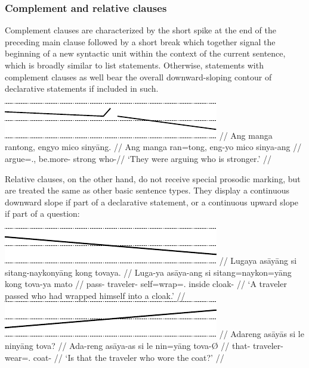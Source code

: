 \subsubsection{Complement and relative clauses}

Complement clauses are characterized by the short 
spike at the end of the preceding main clause followed by a short break which 
together signal the beginning of a new syntactic unit within the context of 
the current sentence, which is broadly similar to list statements. Otherwise, 
statements with complement clauses as well bear the overall downward-sloping 
contour of declarative statements if included in such.

\ex\begingl
	\glpreamble \raisebox{-1.5em}
		{\includegraphics{images/contours-complement.pdf}} //
	\gla Ang manga rantong, engyo mico sinyāng. //
	\glb Ang manga ran=tong, eng-yo mico sinya-ang //
	\glc \AgtT{} \Prog{} argue=\TplN{}.\Aarg{}, be.more-\TsgN{} strong
		who-\Aarg{}//
	\glft `They were arguing who is stronger.' //
\endgl\xe

Relative clauses, on the other hand, do not receive 
special prosodic marking, but are treated the same as other basic sentence 
types. They display a continuous downward slope if part of a 
declarative statement, or a continuous upward slope if part of a question:

\pex[belowexskip=0em]
\a\begingl
	\glpreamble \raisebox{-1.5em}
		{\includegraphics{images/contours-statement.pdf}} //
	\gla Lugaya asāyāng si sitang-naykonyāng kong tovaya. //
	\glb Luga-ya asāya-ang si sitang=naykon=yāng kong tova-ya mato //
	\glc pass-\TsgM{} traveler-\Aarg{} \Rel{} self=wrap=\TsgM{}.\Aarg{} 
		inside cloak-\Loc{} //
	\glft `A traveler passed who had wrapped himself into a cloak.' //
\endgl
\\

\a\label{ex:travelercoat}\begingl
	\glpreamble \raisebox{-1.5em}
		{\includegraphics{images/contours-ynquestion.pdf}} //
	\gla Adareng asāyās si le ninyāng tova? //
	\glb Ada-reng asāya-as si le nin=yāng tova-Ø //
	\glc that-\AargI{} traveler-\Parg{} \Rel{} \PatTI{} wear=\TsgM{}.\Aarg{} 
		coat-\Top{} //
	\glft `Is that the traveler who wore the coat?' //
\endgl
\xe

